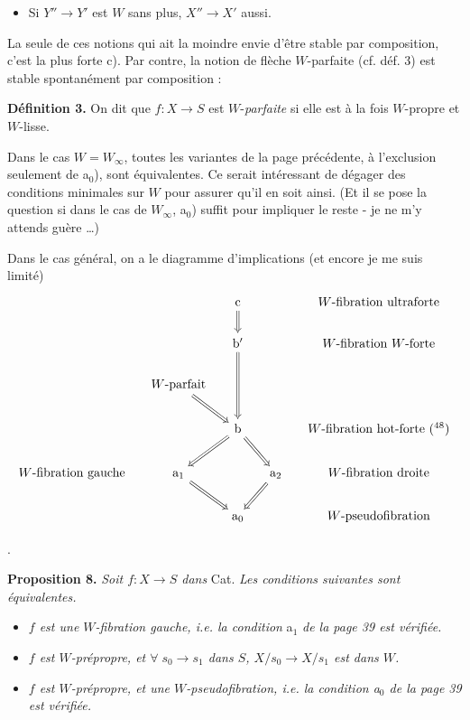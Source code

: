 \documentclass[11pt,leqno]{article}
\newcommand{\printedpage}[1]{\marginpar{\footnotesize p.~#1}}
\newcommand{\msp}[1]{\marginpar{\footnotesize [#1]}}
\newcommand{\fl}{\longrightarrow}
\begin{document}
\begin{itemize}
\item[c)] Si $Y''\fl Y'$ est $W$ sans plus, $X''\fl X'$ aussi.
\end{itemize}

\printedpage{30}
\msp{page 40}La seule de ces notions qui ait la moindre envie d'être stable par composition, c'est la plus forte c). Par contre, la notion de flèche $W$-parfaite (cf. déf. 3) est stable spontanément par composition :

\textbf{Définition 3.} On dit que $f : X\fl S$ est $W$-\textit{parfaite} si elle est à la fois $W$-propre et $W$-lisse.

Dans le cas $W=W_\infty$, toutes les variantes de la page précédente, à l'exclusion seulement de a$_0$), sont équivalentes. Ce serait intéressant de dégager des conditions minimales sur $W$ pour assurer qu'il en soit ainsi. (Et il se pose la question si dans le cas de $W_\infty$, a$_0$) suffit pour impliquer le reste - je ne m'y attends guère \dots)

Dans le cas général, on a le diagramme d'implications (et encore je me suis limité)
\[
\begin{tikzcd}[column sep=small]
 & & \mathrm{c} \arrow[d, Rightarrow] & & \text{$W$-fibration ultraforte} \\
 & & \mathrm{b}' \arrow[dd, Rightarrow] & & \text{$W$-fibration $W$-forte} \\
 & \text{$W$-parfait} \arrow[dr, Rightarrow] & & & \\
 & & \mathrm{b} \arrow[dl, Rightarrow] \arrow[dr, Rightarrow] & & \text{$W$-fibration hot-forte (\footnotemark[48])} \\
\text{$W$-fibration gauche} & \mathrm{a}_1 \arrow[dr, Rightarrow] & & \mathrm{a}_2 \arrow[dl, Rightarrow] & \text{$W$-fibration droite} \\
 & & \mathrm{a}_0 & & \text{$W$-pseudofibration}
\end{tikzcd}
\]

.

\msp{page 41}\textbf{Proposition 8.} \textit{Soit $f : X\fl S$ dans} Cat. \textit{Les conditions suivantes sont équivalentes.}

\begin{itemize}
\item[\textit{a)}] \textit{$f$ est une $W$-fibration gauche, i.e. la condition} a$_1$ \textit{de la page 39 est vérifiée.}

\item[\textit{b)}] \textit{$f$ est $W$-prépropre, et $\forall\; s_0\fl s_1$ dans $S$, $X/s_0\fl X/s_1$ est dans $W$.}

\item[\textit{c)}] \textit{$f$ est $W$-prépropre, et une $W$-pseudofibration, i.e. la condition a$_0$ de la page 39 est vérifiée.} %
\end{itemize}
\end{document}

